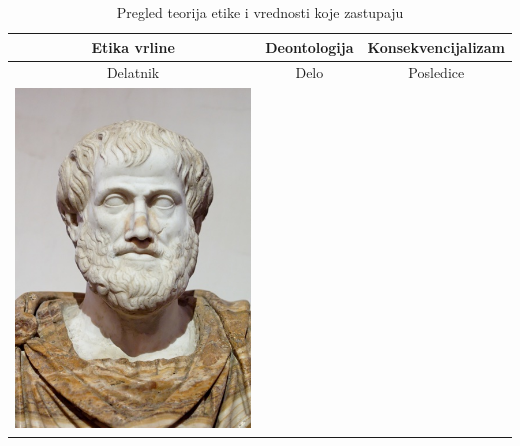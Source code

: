 \documentclass[a4paper]{article}
\begin{document}
\begin{table}[h!]
\begin{center}
\caption{Pregled teorija etike i vrednosti koje zastupaju}
\begin{tabular}{|c|c|c|} \hline
Etika vrline & Deontologija & Konsekvencijalizam\\ \hline
Delatnik & Delo & Posledice\\ \hline
\includegraphics[scale=.2]{slike/aristotel.jpg} & \includegraphics[
\end{tabular}
\end{center}
\end{table}
\end{document}
